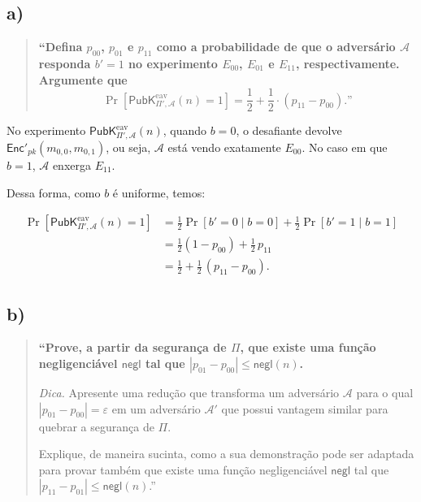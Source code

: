 \documentclass[11pt,a4paper]{article}
\newcommand{\Enc}{\mathsf{Enc}}
\newcommand{\negl}{\mathsf{negl}}
\newcommand{\PubKeav}[3]{\mathsf{PubK}^{\mathrm{eav}}_{#1,#2}(#3)}
\begin{document}
    \subsection*{a)}

    \begin{quote}\small\bfseries
        ``Defina $p_{00}$, $p_{01}$ e $p_{11}$ como a probabilidade de que o adversário
        $\mathcal{A}$ responda $b' = 1$ no experimento $E_{00}$, $E_{01}$ e $E_{11}$,
        respectivamente. Argumente que
        \[
            \Pr\!\left[\PubKeav{\Pi'}{\mathcal{A}}{n} = 1\right]
            = \frac{1}{2} + \frac{1}{2} \cdot (p_{11} - p_{00}).\text{''}
        \]
    \end{quote}

    No experimento $\PubKeav{\Pi'}{\mathcal{A}}{n}$, quando $b=0$, o desafiante devolve $\Enc'_{pk}(m_{0,0},m_{0,1})$, ou seja,
    $\mathcal{A}$ está vendo exatamente $E_{00}$.
    No caso em que $b=1$, $\mathcal{A}$ enxerga $E_{11}$.

    Dessa forma, como $b$ é uniforme, temos:

    \begin{align*}
        \Pr\!\left[\PubKeav{\Pi'}{\mathcal{A}}{n}=1\right]
        &= \tfrac12\Pr[b'=0 \mid b=0] + \tfrac12\Pr[b'=1 \mid b=1]\\
        &= \tfrac12(1-p_{00}) + \tfrac12\,p_{11}\\
        &= \tfrac12 + \tfrac12\,(p_{11}-p_{00}).
    \end{align*}

    \clearpage

    \subsection*{b)}

    \begin{quote}\small\bfseries
        ``Prove, a partir da segurança de $\Pi$, que existe uma função negligenciável
        $\negl$ tal que $|p_{01} - p_{00}| \le \negl(n)$.

        \textit{Dica.} Apresente uma redução que transforma um adversário $\mathcal{A}$
        para o qual $|p_{01} - p_{00}| = \varepsilon$ em um adversário $\mathcal{A}'$ que
        possui vantagem similar para quebrar a segurança de $\Pi$.

        Explique, de maneira sucinta, como a sua demonstração pode ser adaptada para
        provar também que existe uma função negligenciável $\negl$ tal que
        $|p_{11} - p_{01}| \le \negl(n)$.''
    \end{quote}
\end{document}
